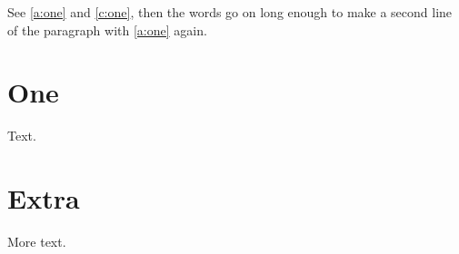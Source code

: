\documentclass[spanish]{report}
\begin{document}
See \autoref{a:one} and \autoref{c:one}, then the words go on long enough to make a second line of the paragraph with \autoref{a:one} again.
\chapter{One}\label{c:one}
Text.
\appendix
\chapter{Extra}\label{a:one}
More text.
\end{document}
